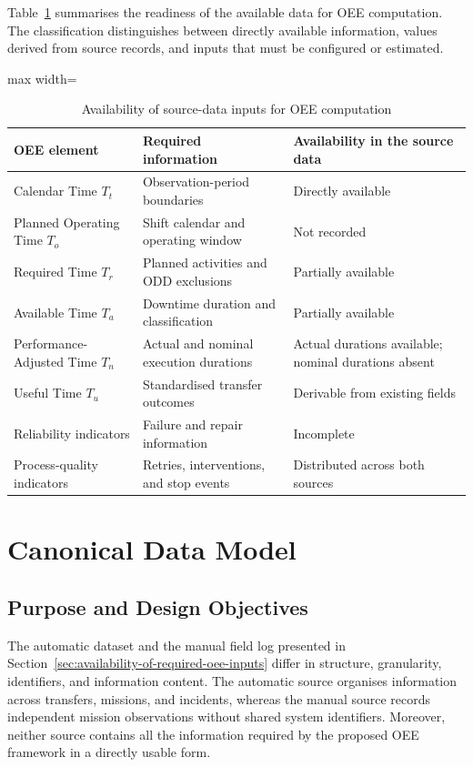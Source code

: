 Table~\ref{tab:oee-data-readiness} summarises the readiness of the available data for OEE computation. The classification distinguishes between directly available information, values derived from source records, and inputs that must be configured or estimated.

\begin{table}[H]
\small
\renewcommand{\arraystretch}{1.3}
\centering
\caption{Availability of source-data inputs for OEE computation}
\label{tab:oee-data-readiness}
\begin{adjustbox}{max width=\textwidth}
\begin{tabular}{|p{3.2cm}|p{5.5cm}|p{5.2cm}|}
\hline
\textbf{OEE element} & \textbf{Required information} & \textbf{Availability in the source data} \\
\hline
Calendar Time $T_t$ & Observation-period boundaries & Directly available \\
\hline
Planned Operating Time $T_o$ & Shift calendar and operating window & Not recorded \\
\hline
Required Time $T_r$ & Planned activities and ODD exclusions & Partially available \\
\hline
Available Time $T_a$ & Downtime duration and classification & Partially available \\
\hline
Performance-Adjusted Time $T_n$ & Actual and nominal execution durations & Actual durations available; nominal durations absent \\
\hline
Useful Time $T_u$ & Standardised transfer outcomes & Derivable from existing fields \\
\hline
Reliability indicators & Failure and repair information & Incomplete \\
\hline
Process-quality indicators & Retries, interventions, and stop events & Distributed across both sources \\
\hline
\end{tabular}
\end{adjustbox}
\end{table}

\section{Canonical Data Model}
\label{sec:canonical-data-model}
\subsection{Purpose and Design Objectives}
\label{subsec:purpose-and-design-objectives}
The automatic dataset and the manual field log presented in Section~\ref{sec:availability-of-required-oee-inputs} differ in structure, granularity, identifiers, and information content. The automatic source organises information across transfers, missions, and incidents, whereas the manual source records independent mission observations without shared system identifiers. Moreover, neither source contains all the information required by the proposed OEE framework in a directly usable form.

